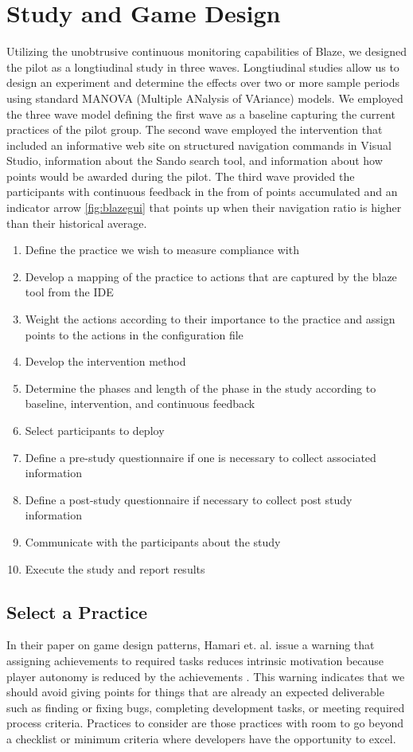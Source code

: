 \documentclass{sig-alternate}
\begin{document}
\section{Study and Game Design}

Utilizing the unobtrusive continuous monitoring capabilities of Blaze, we designed the pilot as a longtiudinal study in three waves.  Longtiudinal studies allow us to design an experiment and determine the effects over two or more sample periods using standard MANOVA (Multiple ANalysis of VAriance) models. \cite{longitudinalbook}  We employed the three wave model defining the first wave as a baseline capturing the current practices of the pilot group.  The second wave employed the intervention that included an informative web site on structured navigation commands in Visual Studio, information about the Sando search tool, and information about how points would be awarded during the pilot.  The third wave provided the participants with continuous feedback in the from of points accumulated and an indicator arrow \ref{fig:blazegui} that points up when their navigation ratio is higher than their historical average.  

\begin{enumerate}
\item Define the practice we wish to measure compliance with
\item Develop a mapping of the practice to actions that are captured by the blaze tool from the IDE
\item Weight the actions according to their importance to the practice and assign points to the actions in the configuration file
\item Develop the intervention method
\item Determine the phases and length of the phase in the study according to baseline, intervention, and continuous feedback
\item Select participants to deploy
\item Define a pre-study questionnaire if one is necessary to collect associated information
\item Define a post-study questionnaire if necessary to collect post study information
\item Communicate with the participants about the study
\item Execute the study and report results
\end{enumerate}

\subsection{Select a Practice}
In their paper on game design patterns, Hamari et. al. issue a warning that assigning achievements to required tasks reduces intrinsic motivation because player autonomy is reduced by the achievements \cite{wbsnipes:Hamari2011Framework} .  This warning indicates that we should avoid giving points for things that are already an expected deliverable such as finding or fixing bugs, completing development tasks, or meeting required process criteria.  Practices to consider are those practices with room to go beyond a checklist or minimum criteria where developers have the opportunity to excel.
\end{document}
